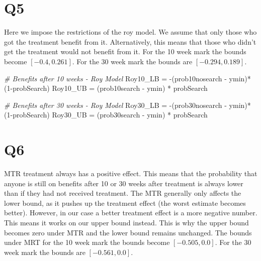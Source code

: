 \documentclass[
]{article}
\newenvironment{Shaded}{\begin{snugshade}}{\end{snugshade}}
\newcommand{\CommentTok}[1]{\textcolor[rgb]{0.56,0.35,0.01}{\textit{#1}}}
\newcommand{\DecValTok}[1]{\textcolor[rgb]{0.00,0.00,0.81}{#1}}
\newcommand{\NormalTok}[1]{#1}
\newcommand{\OtherTok}[1]{\textcolor[rgb]{0.56,0.35,0.01}{#1}}
\newcommand{\SpecialCharTok}[1]{\textcolor[rgb]{0.00,0.00,0.00}{#1}}
\begin{document}
\hypertarget{q5}{%
\section{Q5}\label{q5}}

Here we impose the restrictions of the roy model. We assume that only
those who got the treatment benefit from it. Alternatively, this means
that those who didn't get the treatment would not benefit from it. For
the 10 week mark the bounds become \([-0.4, 0.261]\). For the 30 week
mark the bounds are \([-0.294, 0.189]\).

\begin{Shaded}
\begin{Highlighting}[]
\CommentTok{\# Benefits after 10 weeks {-} Roy Model}
\NormalTok{Roy10\_LB }\OtherTok{=} \SpecialCharTok{{-}}\NormalTok{(prob10nosearch }\SpecialCharTok{{-}}\NormalTok{ ymin)}\SpecialCharTok{*}\NormalTok{ (}\DecValTok{1}\SpecialCharTok{{-}}\NormalTok{probSearch)}
\NormalTok{Roy10\_UB }\OtherTok{=}\NormalTok{  (prob10search }\SpecialCharTok{{-}}\NormalTok{ ymin) }\SpecialCharTok{*}\NormalTok{ probSearch}

\CommentTok{\# Benefits after 30 weeks {-} Roy Model}
\NormalTok{Roy30\_LB }\OtherTok{=} \SpecialCharTok{{-}}\NormalTok{(prob30nosearch }\SpecialCharTok{{-}}\NormalTok{ ymin)}\SpecialCharTok{*}\NormalTok{ (}\DecValTok{1}\SpecialCharTok{{-}}\NormalTok{probSearch)}
\NormalTok{Roy30\_UB }\OtherTok{=}\NormalTok{  (prob30search }\SpecialCharTok{{-}}\NormalTok{ ymin) }\SpecialCharTok{*}\NormalTok{ probSearch}
\end{Highlighting}
\end{Shaded}

\hypertarget{q6}{%
\section{Q6}\label{q6}}

MTR treatment always has a positive effect. This means that the
probability that anyone is still on benefits after 10 or 30 weeks after
treatment is always lower than if they had not received treatment. The
MTR generally only affects the lower bound, as it pushes up the
treatment effect (the worst estimate becomes better). However, in our
case a better treatment effect is a more negative number. This means it
works on our upper bound instead. This is why the upper bound becomes
zero under MTR and the lower bound remains unchanged. The bounds under
MRT for the 10 week mark the bounds become \([-0.505, 0.0]\). For the 30
week mark the bounds are \([-0.561, 0.0]\).
\end{document}
